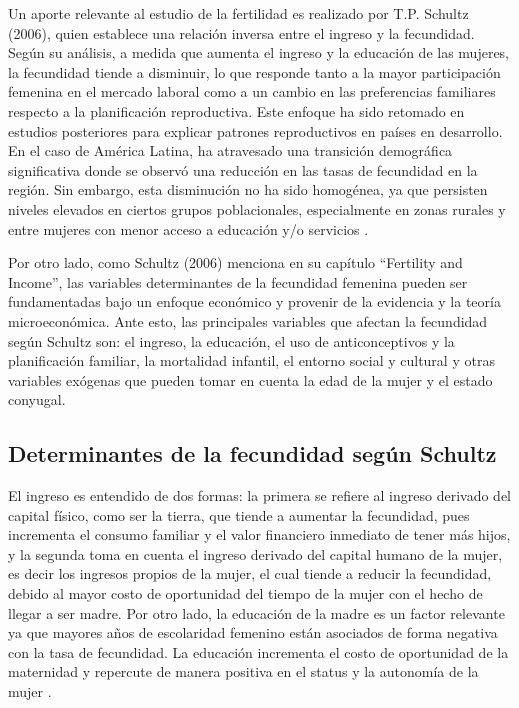 \documentclass[Royal,times,sageh]{sagej}
\begin{document}
Un aporte relevante al estudio de la fertilidad es realizado por T.P.
Schultz (2006), quien establece una relación inversa entre el ingreso y
la fecundidad. Según su análisis, a medida que aumenta el ingreso y la
educación de las mujeres, la fecundidad tiende a disminuir, lo que
responde tanto a la mayor participación femenina en el mercado laboral
como a un cambio en las preferencias familiares respecto a la
planificación reproductiva. Este enfoque ha sido retomado en estudios
posteriores para explicar patrones reproductivos en países en
desarrollo. En el caso de América Latina, ha atravesado una transición
demográfica significativa donde se observó una reducción en las tasas de
fecundidad en la región. Sin embargo, esta disminución no ha sido
homogénea, ya que persisten niveles elevados en ciertos grupos
poblacionales, especialmente en zonas rurales y entre mujeres con menor
acceso a educación y/o servicios \citep{schultz2006fertility}.

Por otro lado, como Schultz (2006) menciona en su capítulo ``Fertility
and Income'', las variables determinantes de la fecundidad femenina
pueden ser fundamentadas bajo un enfoque económico y provenir de la
evidencia y la teoría microeconómica. Ante esto, las principales
variables que afectan la fecundidad según Schultz son: el ingreso, la
educación, el uso de anticonceptivos y la planificación familiar, la
mortalidad infantil, el entorno social y cultural y otras variables
exógenas que pueden tomar en cuenta la edad de la mujer y el estado
conyugal.

\subsection{Determinantes de la fecundidad según
Schultz}\label{determinantes-de-la-fecundidad-seguxfan-schultz}

El ingreso es entendido de dos formas: la primera se refiere al ingreso
derivado del capital físico, como ser la tierra, que tiende a aumentar
la fecundidad, pues incrementa el consumo familiar y el valor financiero
inmediato de tener más hijos, y la segunda toma en cuenta el ingreso
derivado del capital humano de la mujer, es decir los ingresos propios
de la mujer, el cual tiende a reducir la fecundidad, debido al mayor
costo de oportunidad del tiempo de la mujer con el hecho de llegar a ser
madre. Por otro lado, la educación de la madre es un factor relevante ya
que mayores años de escolaridad femenino están asociados de forma
negativa con la tasa de fecundidad. La educación incrementa el costo de
oportunidad de la maternidad y repercute de manera positiva en el status
y la autonomía de la mujer \citep{enriquez2017determinantes}.
\end{document}
